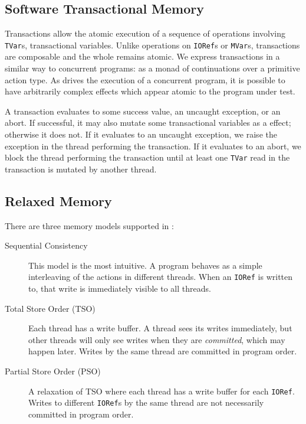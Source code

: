 \subsection{Software Transactional Memory}

Transactions allow the atomic execution of a sequence of operations
involving \verb|TVar|s, transactional variables.  Unlike operations on
\verb|IORef|s or \verb|MVar|s, transactions are composable and the
whole remains atomic.  We express transactions in a similar way to
concurrent programs: as a monad of continuations over a primitive
action type.  As \dejafu{} drives the execution of a concurrent
program, it is possible to have arbitrarily complex effects which
appear atomic to the program under test.

A transaction evaluates to some success value, an uncaught exception,
or an abort.  If successful, it may also mutate some transactional
variables as a effect; otherwise it does not.  If it evaluates to an
uncaught exception, we raise the exception in the thread performing
the transaction.  If it evaluates to an abort, we block the thread
performing the transaction until at least one \verb|TVar| read in the
transaction is mutated by another thread.

\subsection{Relaxed Memory}

There are three memory models supported in \dejafu{}:

\begin{description}
\item[Sequential Consistency] This model is the most intuitive.  A program
  behaves as a simple interleaving of the actions in different threads.  When an
  \texttt{IORef} is written to, that write is immediately visible to all
  threads.

\item[Total Store Order (TSO)] Each thread has a write buffer.  A thread sees
  its writes immediately, but other threads will only see writes when they are
  \emph{committed}, which may happen later.  Writes by the same thread are
  committed in program order.

\item[Partial Store Order (PSO)] A relaxation of TSO where each thread has a
  write buffer for each \verb|IORef|.  Writes to different \verb|IORef|s by the
  same thread are not necessarily committed in program order.
\end{description}

